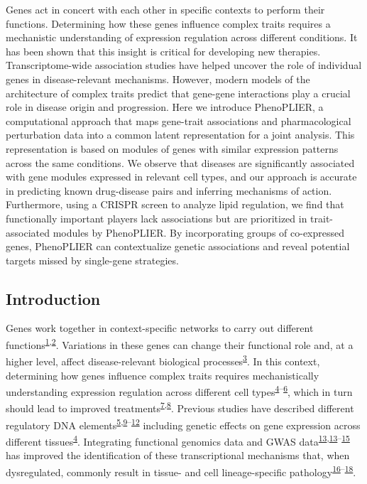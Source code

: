 \documentclass[
  a4paper,
]{article}
\begin{document}
Genes act in concert with each other in specific contexts to perform their functions.
Determining how these genes influence complex traits requires a mechanistic understanding of expression regulation across different conditions.
It has been shown that this insight is critical for developing new therapies.
Transcriptome-wide association studies have helped uncover the role of individual genes in disease-relevant mechanisms.
However, modern models of the architecture of complex traits predict that gene-gene interactions play a crucial role in disease origin and progression.
Here we introduce PhenoPLIER, a computational approach that maps gene-trait associations and pharmacological perturbation data into a common latent representation for a joint analysis.
This representation is based on modules of genes with similar expression patterns across the same conditions.
We observe that diseases are significantly associated with gene modules expressed in relevant cell types, and our approach is accurate in predicting known drug-disease pairs and inferring mechanisms of action.
Furthermore, using a CRISPR screen to analyze lipid regulation, we find that functionally important players lack associations but are prioritized in trait-associated modules by PhenoPLIER.
By incorporating groups of co-expressed genes, PhenoPLIER can contextualize genetic associations and reveal potential targets missed by single-gene strategies.

\hypertarget{introduction}{%
\subsection{Introduction}\label{introduction}}

Genes work together in context-specific networks to carry out different functions\textsuperscript{\protect\hyperlink{ref-e0tRKjE5}{1},\protect\hyperlink{ref-CVF61Un5}{2}}.
Variations in these genes can change their functional role and, at a higher level, affect disease-relevant biological processes\textsuperscript{\protect\hyperlink{ref-Om8ZhS06}{3}}.
In this context, determining how genes influence complex traits requires mechanistically understanding expression regulation across different cell types\textsuperscript{\protect\hyperlink{ref-9Pr9idng}{4}--\protect\hyperlink{ref-nhaocxmR}{6}}, which in turn should lead to improved treatments\textsuperscript{\protect\hyperlink{ref-REXpV7nA}{7},\protect\hyperlink{ref-PgEwSS4Q}{8}}.
Previous studies have described different regulatory DNA elements\textsuperscript{\protect\hyperlink{ref-1DoyZS7y0}{5},\protect\hyperlink{ref-15J98V2qM}{9}--\protect\hyperlink{ref-xRGqPsT2}{12}} including genetic effects on gene expression across different tissues\textsuperscript{\protect\hyperlink{ref-9Pr9idng}{4}}.
Integrating functional genomics data and GWAS data\textsuperscript{\protect\hyperlink{ref-WFslDIWl}{13},\protect\hyperlink{ref-WFslDIWl}{13}--\protect\hyperlink{ref-z8MQTAnJ}{15}} has improved the identification of these transcriptional mechanisms that, when dysregulated, commonly result in tissue- and cell lineage-specific pathology\textsuperscript{\protect\hyperlink{ref-O0e3EhY6}{16}--\protect\hyperlink{ref-wNE0EQlN}{18}}.
\end{document}
